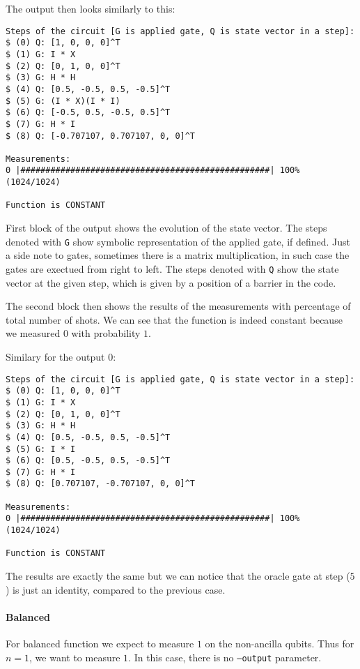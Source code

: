 \documentclass[a4paper,11pt]{article}
\begin{document}
The output then looks similarly to this:
\begin{verbatim}
Steps of the circuit [G is applied gate, Q is state vector in a step]:
$ (0) Q: [1, 0, 0, 0]^T
$ (1) G: I * X
$ (2) Q: [0, 1, 0, 0]^T
$ (3) G: H * H
$ (4) Q: [0.5, -0.5, 0.5, -0.5]^T
$ (5) G: (I * X)(I * I)
$ (6) Q: [-0.5, 0.5, -0.5, 0.5]^T
$ (7) G: H * I
$ (8) Q: [-0.707107, 0.707107, 0, 0]^T

Measurements: 
0 |##################################################| 100% (1024/1024)

Function is CONSTANT   
\end{verbatim}

First block of the output shows the evolution of the state vector.
The steps denoted with \texttt{G} show symbolic representation of the applied gate, if defined.
Just a side note to gates, sometimes there is a matrix multiplication, in such case the gates are exectued from right to left.
The steps denoted with \texttt{Q} show the state vector at the given step, which is given by a position of a barrier in the code.

The second block then shows the results of the measurements with percentage of total number of shots.
We can see that the function is indeed constant because we measured $0$ with probability $1$.

Similary for the output $0$:
\begin{verbatim}
Steps of the circuit [G is applied gate, Q is state vector in a step]:
$ (0) Q: [1, 0, 0, 0]^T
$ (1) G: I * X
$ (2) Q: [0, 1, 0, 0]^T
$ (3) G: H * H
$ (4) Q: [0.5, -0.5, 0.5, -0.5]^T
$ (5) G: I * I
$ (6) Q: [0.5, -0.5, 0.5, -0.5]^T
$ (7) G: H * I
$ (8) Q: [0.707107, -0.707107, 0, 0]^T

Measurements: 
0 |##################################################| 100% (1024/1024)

Function is CONSTANT
\end{verbatim}

The results are exactly the same but we can notice that the oracle gate at step ($5$) is just an identity, compared to the previous case.

\paragraph{Balanced}
For balanced function we expect to measure $1$ on the non-ancilla qubits.
Thus for $n = 1$, we want to measure $1$.
In this case, there is no \texttt{--output} parameter.
\end{document}
